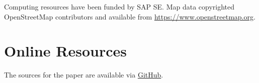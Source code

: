 \documentclass[
]{ceurart}
\begin{document}
\begin{acknowledgments}
  Computing resources have been funded by SAP SE. Map data copyrighted OpenStreetMap contributors and available from \url{https://www.openstreetmap.org}.

\end{acknowledgments}

\printbibliography

\appendix

\section{Online Resources}

The sources for the paper are available via \href{https://github.com/MartinBoeckling/WildfirePredictionSTKG}{GitHub}.
\end{document}

